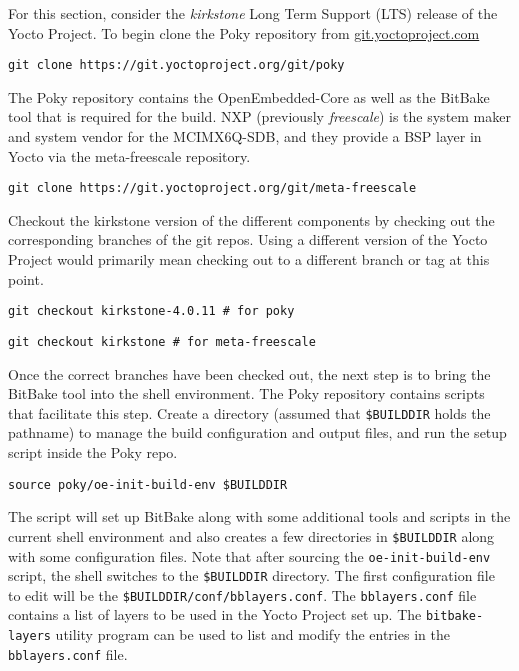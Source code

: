 For this section, consider the \textit{kirkstone} Long Term Support (LTS) release of the Yocto Project. To begin clone the Poky repository from \href{https://git.yoctoproject.com}{git.yoctoproject.com}

\begin{verbatim}
git clone https://git.yoctoproject.org/git/poky
\end{verbatim}

The Poky repository contains the OpenEmbedded-Core as well as the BitBake tool that is required for the build. NXP (previously \textit{freescale}) is the system maker and system vendor for the MCIMX6Q-SDB, and they provide a BSP layer in Yocto via the meta-freescale repository.

\begin{verbatim}
git clone https://git.yoctoproject.org/git/meta-freescale
\end{verbatim}

Checkout the kirkstone version of the different components by checking out the corresponding branches of the git repos. Using a different version of the Yocto Project would primarily mean checking out to a different branch or tag at this point.

\begin{verbatim}
git checkout kirkstone-4.0.11 # for poky
\end{verbatim}

\begin{verbatim}
git checkout kirkstone # for meta-freescale
\end{verbatim}

Once the correct branches have been checked out, the next step is to bring the BitBake tool into the shell environment. The Poky repository contains scripts that facilitate this step. Create a directory (assumed that \texttt{\$BUILDDIR} holds the pathname) to manage the build configuration and output files, and run the setup script inside the Poky repo.

\begin{verbatim}
source poky/oe-init-build-env $BUILDDIR
\end{verbatim}

The script will set up BitBake along with some additional tools and scripts in the current shell environment and also creates a few directories in \texttt{\$BUILDDIR} along with some configuration files. Note that after sourcing the \texttt{oe-init-build-env} script, the shell switches to the \texttt{\$BUILDDIR} directory. The first configuration file to edit will be the \texttt{\$BUILDDIR/conf/bblayers.conf}. The \texttt{bblayers.conf} file contains a list of layers to be used in the Yocto Project set up. The \texttt{bitbake-layers} utility program can be used to list and modify the entries in the \texttt{bblayers.conf} file.

